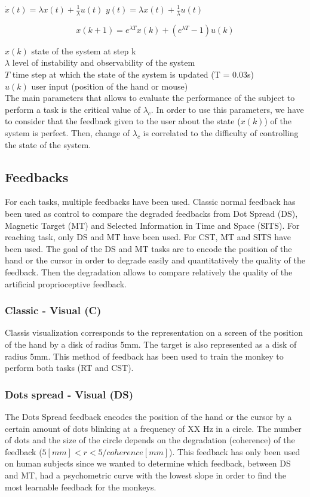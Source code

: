 \documentclass[preprint,12pt]{elsarticle}
\begin{document}
$\dot{x}(t) = \lambda x(t) + \frac{1}{\lambda}u(t)$
$y(t) = \lambda x(t) + \frac{1}{\lambda}u(t)$

\begin{equation} 
x(k+1) = e^{\lambda T}x(k) + (e^{\lambda T} - 1)u(k)
\label{eq:statefunc}
\end{equation}

$x(k)$ state of the system at step k\\
$\lambda$ level of instability and observability of the system\\
$T$ time step at which the state of the system is updated (T = 0.03s) \\
$u(k)$ user input (position of the hand or mouse)\\

The main parameters that allows to evaluate the performance of the subject to perform a task is the critical value of $\lambda_c$. In order to use this parameters, we have to consider that the feedback given to the user about the state ($x(k)$) of the system is perfect. Then, change of $\lambda_c$ is correlated to the difficulty of controlling the state of the system.
\subsection{Feedbacks}
For each tasks, multiple feedbacks have been used. Classic normal feedback has been used as control to compare the degraded feedbacks from Dot Spread (DS), Magnetic Target (MT) and Selected Information in Time and Space (SITS). For reaching task, only DS and MT have been used. For CST, MT and SITS have been used. The goal of the DS and MT tasks are to encode the position of the hand or the cursor in order to degrade easily and quantitatively the quality of the feedback. Then the degradation allows to compare relatively the quality of the artificial proprioceptive feedback.
\subsubsection{Classic - Visual (C)}
Classis visualization corresponds to the representation on a screen of the position of the hand by a disk of radius 5mm. The target is also represented as a disk of radius 5mm. This method of feedback has been used to train the monkey to perform both tasks (RT and CST). 
\subsubsection{Dots spread - Visual (DS)}
The Dots Spread feedback encodes the position of the hand or the cursor by a certain amount of dots blinking at a frequency of XX Hz in a circle. The number of dots and the size of the circle depends on the degradation (coherence) of the feedback ($ 5 [mm] < r <5/coherence [mm]$). This feedback has only been used on human subjects since we wanted to determine which feedback, between DS and MT, had a psychometric curve with the lowest slope in order to find the most learnable feedback for the monkeys.
\end{document}
